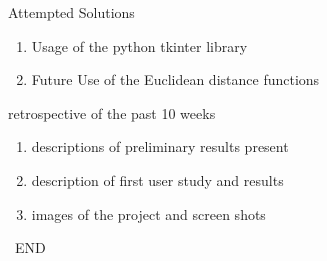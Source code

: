 \documentclass{beamer}
\begin{document}
\begin{frame}[t]{Attempted Solutions}\vspace{.5in}
\begin{enumerate}
\item Usage of the  python tkinter library 
\item Future Use of the Euclidean distance functions  
\end{enumerate}
\end{frame}


\begin{frame}[t]{retrospective of the past 10 weeks}
\begin{enumerate}
\item descriptions of preliminary results present 
\item description of first user study and results 
\item images of the project and screen shots  
\end{enumerate}

\huge\centering\ END 
\end{frame}
 
\end{document}
